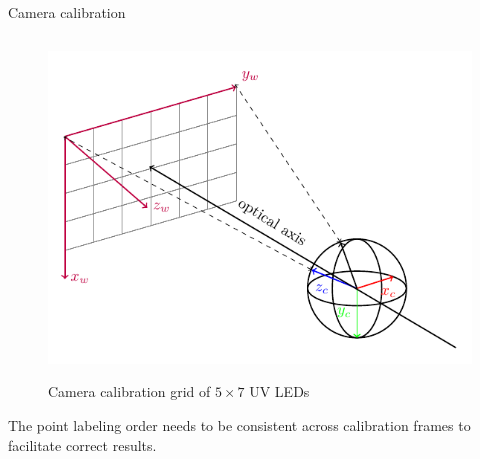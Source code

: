 \documentclass{beamer}
\begin{document}
\begin{frame}{Camera calibration}
\begin{columns}[T]
    \begin{column}{0.48\textwidth}
        \vspace{-0.3cm}
        \begin{figure}[H]
            \centering
            \includegraphics[width=\textwidth]{../fig/tikz/extrinsic.pdf}
            \label{fig:extrinsic_img}
            \caption{Camera calibration grid of $5\times7$ UV LEDs}
        \end{figure}
        
        \tiny{
            The point labeling order needs to be consistent across calibration frames to facilitate correct results.
        }
    \end{column}
\end{columns}
    
\end{frame}
\end{document}

